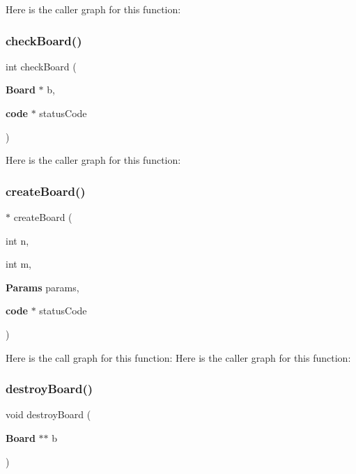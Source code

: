 Here is the caller graph for this function\+:
\label{funciones_8h_a2ba9e38caf8780cd911190db47e91981} 
\subsubsection{check\+Board()}
{\footnotesize\ttfamily int check\+Board (\begin{DoxyParamCaption}\item[{{\bf Board} $\ast$}]{b,  }\item[{{\bf code} $\ast$}]{status\+Code }\end{DoxyParamCaption})}

Here is the caller graph for this function\+:
\label{funciones_8h_aa971770733231651e7c3e68530aa5563} 
\subsubsection{create\+Board()}
{\footnotesize{}$\ast$ create\+Board (\begin{DoxyParamCaption}\item[{int}]{n,  }\item[{int}]{m,  }\item[{{\bf Params}}]{params,  }\item[{{\bf code} $\ast$}]{status\+Code }\end{DoxyParamCaption})}

Here is the call graph for this function\+:
Here is the caller graph for this function\+:
\label{funciones_8h_a87582dd6476bdbcd4c9dab6c371a0ef9} 
\subsubsection{destroy\+Board()}
{\footnotesize\ttfamily void destroy\+Board (\begin{DoxyParamCaption}\item[{{\bf Board} $\ast$$\ast$}]{b }\end{DoxyParamCaption})}

\label{funciones_8h_a76eb46ff45a6b9a08d6e52d92302cce9} 
